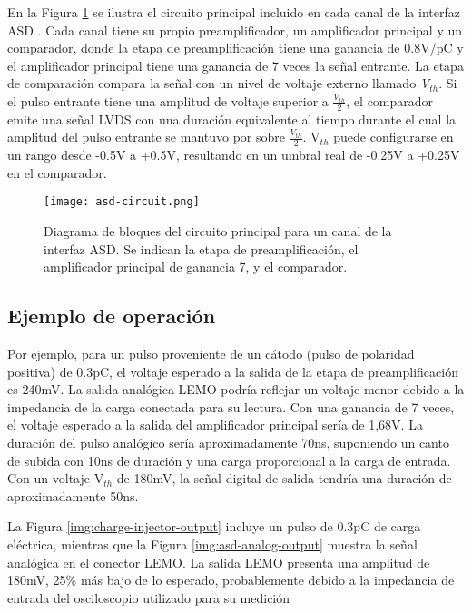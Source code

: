 En la Figura \ref{img:asd-circuit}  se ilustra el circuito principal incluido en cada canal de la interfaz ASD . Cada canal tiene su propio preamplificador, un amplificador principal y un comparador\cite{1999ATLASICs}, donde la etapa de preamplificación tiene una ganancia de 0.8V/pC y el amplificador principal tiene una ganancia de 7 veces la señal entrante. La etapa de comparación compara la señal con un nivel de voltaje externo llamado \textit{V$_{th}$}. Si el pulso entrante tiene una amplitud de voltaje superior a $\frac{V_{th}}{2}$, el comparador emite una señal LVDS con una duración equivalente al tiempo durante el cual la amplitud del pulso entrante se mantuvo por sobre $\frac{V_{th}}{2}$. V$_{th}$ puede configurarse en un rango desde -0.5V a +0.5V, resultando en un umbral real de -0.25V a +0.25V en el comparador\cite{1999ATLASICs}.

\begin{figure}[h]
	\centering
	\texttt{[image: asd-circuit.png]}
	\caption{Diagrama de bloques del circuito principal para un canal de la interfaz ASD. Se indican la etapa de preamplificación, el amplificador principal de ganancia 7, y el comparador.}
	\label{img:asd-circuit}
\end{figure}

\subsection{Ejemplo de operación}

Por ejemplo, para un pulso proveniente de un cátodo (pulso de polaridad positiva) de 0.3pC, el voltaje esperado a la salida de la etapa de preamplificación es 240mV. La salida analógica LEMO podría reflejar un voltaje menor debido a la impedancia de la carga conectada para su lectura. Con una ganancia de 7 veces, el voltaje esperado a la salida del amplificador principal sería de 1,68V. La duración del pulso analógico sería aproximadamente 70ns, suponiendo un canto de subida con 10ns de duración y una carga proporcional a la carga de entrada. Con un voltaje V$_{th}$ de 180mV, la señal digital de salida tendría una duración de aproximadamente 50ns.

La Figura \ref{img:charge-injector-output} incluye un pulso de 0.3pC de carga eléctrica, mientras que la Figura \ref{img:asd-analog-output} muestra la señal analógica en el conector LEMO. La salida LEMO presenta una amplitud de 180mV, 25\% más bajo de lo esperado, probablemente debido a la impedancia de entrada del osciloscopio utilizado para su medición

